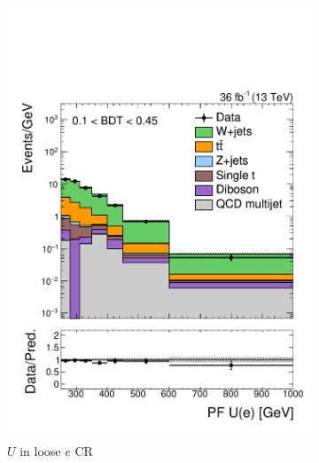 \begin{figure}[]
\begin{center}
\begin{subfigure}[t]{0.32\textwidth}
            \includegraphics[width=\textwidth]{figures/monotop/prefit/singleelectronw_loose_pfUWmag_logy.pdf}
            \caption{$U$ in loose $e$ CR}
        \end{subfigure}
        \begin{subfigure}[t]{0.32\textwidth}

\end{subfigure}
\end{center}
\end{figure}
